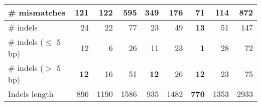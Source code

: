 \documentclass[12pt,a4paper]{article}
\begin{document}
\begin{table}[ht]
\begin{center}
\begin{tabular}{|l*{8}{|r}|}
\# mismatches & 121 & 122 & 595 & 349 & 176 & {\bf 71} & 114 & 872 \\ \hline
\# indels & 24 & 22 & 77 & 23 & 49 & {\bf 13} & 51 & 147 \\ \hline
\hspace{5mm}\# indels ($\leq$ 5 bp) & 12 & 6 & 26 & 11 & 23 & {\bf 1} & 28 & 72 \\ \hline
\hspace{5mm}\# indels ($>$ 5 bp) & {\bf 12} & 16 & 51 & {\bf 12} & 26 & {\bf 12} & 23 & 75 \\ \hline
Indels length & 896 & 1190 & 1586 & 935 & 1482 & {\bf 770} & 1353 & 2933 \\ \hline
\end{tabular}
\end{center}
\end{table}
\end{document}
